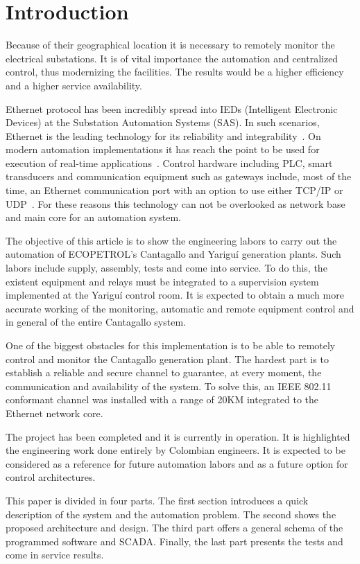 
\section{Introduction}


Because of their geographical location it is necessary to remotely
monitor the electrical substations. It is of vital importance the
automation and centralized control, thus modernizing the facilities.
The results would be a higher efficiency and a higher service
availability.


Ethernet protocol has been incredibly spread into IEDs (Intelligent 
Electronic Devices) at the Substation Automation Systems (SAS).
In such scenarios, Ethernet is the leading technology for its reliability
and integrability~\cite{pozzuoli:2003}. On modern automation 
implementations it has reach the point to be used for execution of 
real-time applications~\cite{bello:2001}. Control hardware including 
PLC, smart transducers and communication equipment such as gateways 
include, most of the time, an Ethernet communication port with an option 
to use either TCP/IP or UDP~\cite{viegas:2006}. For these reasons
this technology can not be overlooked as network base and main core
for an automation system.

The objective of this article is to show the engineering labors to
carry out the automation of ECOPETROL's Cantagallo and Yariguí
generation plants. Such labors include supply, assembly, tests and
come into service. To do this, the existent equipment and relays must
be integrated to a supervision system implemented at the Yariguí
control room. It is expected to obtain a much more accurate working of
the monitoring, automatic and remote equipment control and in general
of the entire Cantagallo system.

One of the biggest obstacles for this implementation is to be able to
remotely control and monitor the Cantagallo generation plant. The
hardest part is to establish a reliable and secure channel to
guarantee, at every moment, the communication and availability of the
system. To solve this, an IEEE 802.11 conformant channel was installed
with a range of 20KM integrated to the Ethernet network core.

The project has been completed and it is currently in operation. It is
highlighted the engineering work done entirely by Colombian engineers.
It is expected to be considered as a reference for future automation
labors and as a future option for control architectures.

This paper is divided in four parts. The first section introduces a
quick description of the system and the automation problem. The second
shows the proposed architecture and design. The third part offers a
general schema of the programmed software and SCADA. Finally, the last
part presents the tests and come in service results.
